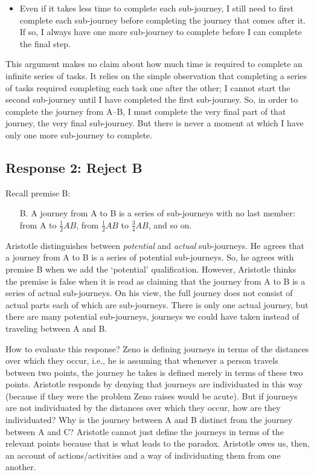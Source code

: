 \documentclass[oneside]{article}
\begin{document}
\begin{itemize}
\itemsep1pt\parskip0pt
\item
  Even if it takes less time to complete each sub-journey, I still need
  to first complete each sub-journey before completing the journey that
  comes after it. If so, I always have one more sub-journey to complete
  before I can complete the final step.
\end{itemize}
This argument makes no claim about how much time is required to complete an infinite series of tasks. It relies on the simple observation that completing a series of tasks required completing each task one after the other; I cannot start the second sub-journey until I have completed the first sub-journey. So, in order to complete the journey from A--B, I must complete the very final part of that journey, the very final sub-journey. But there is never a moment at which I have only one more sub-journey to complete. 

\subsection*{Response 2: Reject B}

Recall premise B: 
\begin{enumerate}
\item[B.]  A journey from A to B is a series of sub-journeys with no last member:
  from A to \(\frac{1}{2}AB\), from \(\frac{1}{2}AB\) to
  \(\frac{3}{4}AB\), and so on.
  \end{enumerate}
Aristotle distinguishes between \emph{potential} and \emph{actual} sub-journeys. He agrees that a journey from A to B is a series of potential sub-journeys. So, he agrees with premise B when we add the `potential' qualification. However, Aristotle thinks the premise is false when it is read as claiming that the journey from A to B is a series of actual sub-journeys. On his view, the full journey does not consist of actual parts each of which are sub-journeys. There is only one actual journey, but there are many potential sub-journeys, journeys we could have taken instead of traveling between A and  B. 

How to evaluate this response? Zeno is defining journeys in terms of the distances over which they occur, i.e., he is assuming that whenever a person travels between two points, the journey he takes is defined merely in terms of these two points. Aristotle responds by denying that journeys are individuated in this way (because if they were the problem Zeno raises would be acute). But if journeys are not individuated by the distances over which they occur, how are they individuated? Why is the journey between A and B distinct from the journey between A and C? Aristotle cannot just define the journeys in terms of the relevant points because that is what leads to the paradox. Aristotle owes us, then, an account of actions/activities and a way of individuating them from one another. 
\end{document}
